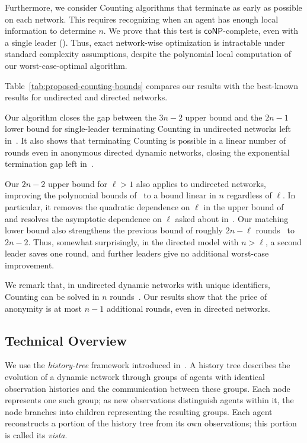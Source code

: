 \documentclass[11pt]{article}
\begin{document}
Furthermore, we consider Counting algorithms that terminate as early as possible on each network. This requires recognizing when an agent has enough local information to determine $n$. We prove that this test is \(\mathsf{coNP}\)-complete, even with a single leader ().
Thus, exact network-wise optimization is intractable under standard complexity assumptions, despite the polynomial local computation of our worst-case-optimal algorithm.
 
Table~\ref{tab:proposed-counting-bounds} compares our results with the best-known results for undirected and directed networks.

Our algorithm closes the gap between the $3n-2$
upper bound and the $2n-1$ lower bound for single-leader terminating
Counting in undirected networks left in~\cite{DV22,VIG24,DLV26}. It also shows that terminating Counting is possible in a linear number of rounds even in anonymous directed dynamic networks, closing the exponential termination gap left in~\cite{VIG24}.%

Our $2n-2$ upper bound for $\ell>1$ also applies to undirected
networks, improving the polynomial bounds of~\cite{KM22,DLV26}
to a bound linear in $n$ regardless of $\ell$. In particular,
it removes the quadratic dependence on $\ell$ in the upper bound
of~\cite{DLV26} and resolves the asymptotic dependence on $\ell$
asked about in~\cite{VIG24}. Our matching lower bound also strengthens the
previous bound of roughly $2n-\ell$ rounds~\cite{DLV26} to $2n-2$.
Thus, somewhat surprisingly, in the directed model with $n>\ell$, a second leader saves
one round, and further leaders give no additional worst-case
improvement.

We remark that, in undirected dynamic networks with unique identifiers, Counting can
be solved in $n$ rounds~\cite{KLO10}. Our results show that the price of anonymity is at most $n-1$ additional rounds, even in directed networks.

\subsection{Technical Overview}

We use the \emph{history-tree} framework introduced in~\cite{DV22}.
A history tree describes the evolution of a dynamic network through
groups of agents with identical observation histories and the
communication between these groups. Each node represents one such
group; as new observations distinguish agents within it, the node
branches into children representing the resulting groups.
Each agent reconstructs a portion of the history tree from its own
observations; this portion is called its \emph{vista}.
\end{document}
